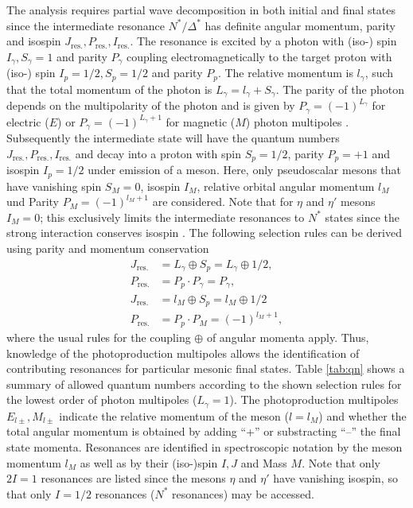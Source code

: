 The analysis requires partial wave decomposition in both initial and final states \cite{Drechsel} since the intermediate resonance $N^*/\Delta^*$ has definite angular momentum, parity  and isospin $J_\text{res.}, P_\text{res.}, I_\text{res.}$. The resonance is excited by a photon with (iso-) spin $I_\gamma,S_\gamma =1$ and parity $P_\gamma$ coupling electromagnetically to the target proton with (iso-) spin $I_p=1/2,S_p=1/2$ and parity $P_p$. The relative momentum is $l_\gamma$, such that the total momentum of the photon is $L_\gamma=l_\gamma+S_\gamma$. The parity of the photon depends on the multipolarity of the photon and is given by $P_\gamma=(-1)^{L_\gamma}$ for electric ($E$) or $P_\gamma=(-1)^{L_\gamma+1}$ for magnetic ($M$) photon multipoles \cite{Drechsel}. Subsequently the intermediate state will have the quantum numbers $J_\text{res.}, P_\text{res.}, I_\text{res.}$ and decay into a proton with spin $S_p=1/2$, parity $P_p=+1$ and isospin $I_p=1/2$ under emission of a meson. Here, only pseudoscalar mesons that have vanishing spin $S_M=0$, isospin $I_M$, relative orbital angular momentum $l_M$ und Parity $P_M=(-1)^{l_M+1}$ are considered. Note that for $\eta$ and $\eta'$ mesons $I_M=0$; this exclusively limits the intermediate resonances to $N^*$ states since the strong interaction conserves isospin \cite{pdg}. The following selection rules can be derived using parity and momentum conservation \cite{Krusche,farahphd}
\begin{align}
	J_\text{res.}&=L_\gamma\oplus S_p = L_\gamma\oplus 1/2,\\
	P_\text{res.}&=P_p\cdot P_\gamma=P_\gamma,\\
	J_\text{res.}&=l_M\oplus S_p = l_M\oplus 1/2\\
	P_\text{res.}&=P_p\cdot P_M=(-1)^{l_M+1},
\end{align}
where the usual rules for the coupling $\oplus$ of angular momenta \cite{theo3} apply. Thus, knowledge of the photoproduction multipoles allows the identification of contributing resonances for particular mesonic final states. Table \ref{tab:qn} shows a summary of allowed quantum numbers according to the shown selection rules for the lowest order of photon multipoles ($L_\gamma=1$). The photoproduction multipoles $E_{l\pm},M_{l\pm}$ indicate the relative momentum of the meson ($l=l_M$) and whether the total angular momentum is obtained by adding \enquote{+} or substracting \enquote{--} the final state momenta. Resonances are identified in spectroscopic notation by the meson momentum $l_M$ as well as by their (iso-)spin $I,J$ and Mass $M$. Note that only $2I=1$ resonances are listed since the mesons $\eta$ and $\eta'$ have vanishing isospin, so that only $I=1/2$ resonances ($N^*$ resonances) may be accessed.

